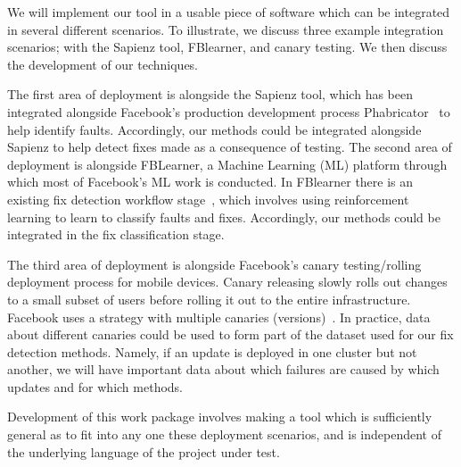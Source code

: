 
We will implement our tool in a usable piece of software which can be integrated in several different scenarios. 
To illustrate, we discuss three example integration scenarios; with the Sapienz tool, FBlearner, and canary testing. We then discuss the development of our techniques.

The first area of deployment is alongside the Sapienz tool, which
has been integrated alongside Facebook's production development process Phabricator~\citep{Facebook1} to help identify faults. Accordingly, our methods could be integrated alongside Sapienz to help detect fixes made as a consequence of testing. 
The second area of deployment is alongside FBLearner, a Machine Learning (ML) platform through which most of Facebook's ML work is conducted. In FBlearner there is an existing fix detection workflow stage~\citep{Facebook1}, which involves using reinforcement learning to learn to classify faults and fixes. Accordingly, our methods could be integrated in the fix classification stage. 

The third area of deployment is alongside Facebook's canary testing/rolling deployment process for mobile devices. Canary releasing slowly rolls out changes to a small subset of users before rolling it out to the entire infrastructure. Facebook uses a strategy with multiple canaries (versions)~\cite{7883285,canaryrelease}.
In practice, data about different canaries could be used to form part of the dataset used for our fix detection methods. Namely, if an update is deployed in one cluster but not another, we will have important data about which failures are caused by which updates and for which methods. 

Development of this work package involves making a tool which is  sufficiently general as to fit into any one these deployment scenarios, and is independent of the underlying language of the project under test. 
